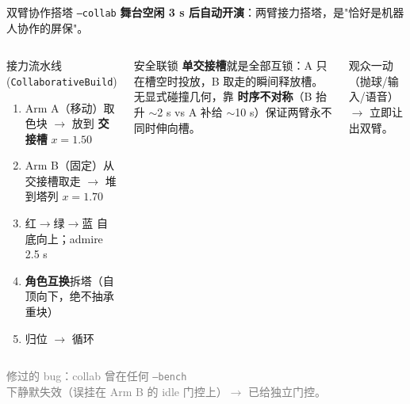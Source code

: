 \documentclass[aspectratio=169, 11pt]{beamer}
\begin{document}
\begin{frame}{双臂协作搭塔 \texttt{--collab}}
\textbf{舞台空闲 3 s 后自动开演}：两臂接力搭塔，是"恰好是机器人协作的屏保"。
\vspace{4pt}
\begin{columns}[T]
\begin{block}{接力流水线 (\texttt{CollaborativeBuild})}
\footnotesize
\begin{enumerate}
\item Arm A（移动）取色块 $\to$ 放到 \textbf{交接槽} $x=1.50$
\item Arm B（固定）从交接槽取走 $\to$ 堆到塔列 $x=1.70$
\item 红$\to$绿$\to$蓝 自底向上；admire 2.5 s
\item \textbf{角色互换}拆塔（自顶向下，绝不抽承重块）
\item 归位 $\to$ 循环
\end{enumerate}
\end{block}

\begin{block}{安全联锁}
\footnotesize
\textbf{单交接槽}就是全部互锁：A 只在槽空时投放，B 取走的瞬间释放槽。无显式碰撞几何，靠 \textbf{时序不对称}（B 抬升 $\sim$2 s vs A 补给 $\sim$10 s）保证两臂永不同时伸向槽。
\end{block}
\vspace{2pt}
\footnotesize\textcolor{urcyan}{观众一动（抛球/输入/语音）$\to$ 立即让出双臂。}
\end{columns}

\vspace{4pt}
\footnotesize\textcolor{gray}{修过的 bug：collab 曾在任何 \texttt{--bench} 下静默失效（误挂在 Arm B 的 idle 门控上）$\to$ 已给独立门控。}
\end{frame}
\end{document}
